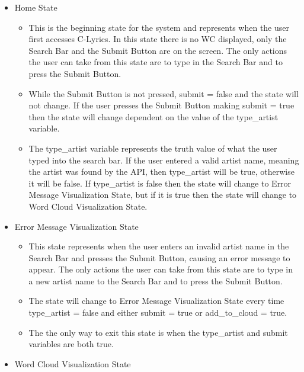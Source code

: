 \documentclass[]{article}
\begin{document}
\begin{itemize}
\itemsep1pt\parskip0pt
\item
  Home State

  \begin{itemize}
  \itemsep1pt\parskip0pt
  \item
    This is the beginning state for the system and represents when the
    user first accesses C-Lyrics. In this state there is no WC
    displayed, only the Search Bar and the Submit Button are on the
    screen. The only actions the user can take from this state are to
    type in the Search Bar and to press the Submit Button.
  \item
    While the Submit Button is not pressed, submit = false and the state
    will not change. If the user presses the Submit Button making submit
    = true then the state will change dependent on the value of the
    type\_artist variable.
  \item
    The type\_artist variable represents the truth value of what the
    user typed into the search bar. If the user entered a valid artist
    name, meaning the artist was found by the API, then type\_artist
    will be true, otherwise it will be false. If type\_artist is false
    then the state will change to Error Message Visualization State, but
    if it is true then the state will change to Word Cloud Visualization
    State.
  \end{itemize}
\item
  Error Message Visualization State

  \begin{itemize}
  \itemsep1pt\parskip0pt
  \item
    This state represents when the user enters an invalid artist name in
    the Search Bar and presses the Submit Button, causing an error
    message to appear. The only actions the user can take from this
    state are to type in a new artist name to the Search Bar and to
    press the Submit Button.
  \item
    The state will change to Error Message Visualization State every
    time type\_artist = false and either submit = true or add\_to\_cloud
    = true.
  \item
    The the only way to exit this state is when the type\_artist and
    submit variables are both true.
  \end{itemize}
\item
  Word Cloud Visualization State


\end{itemize}
\end{document}
